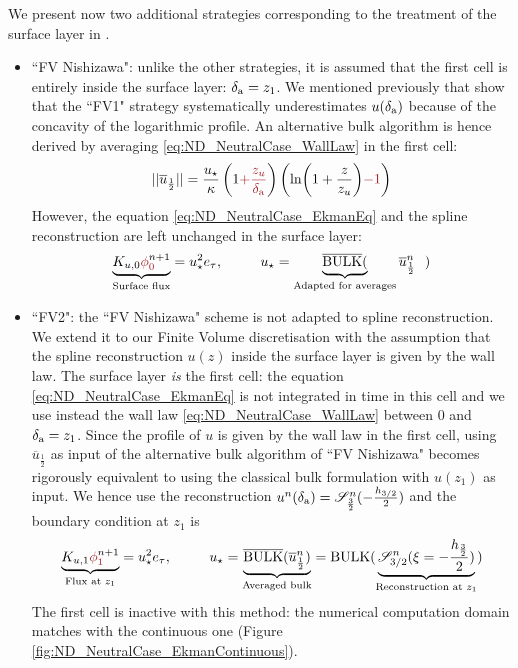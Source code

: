We present now two additional strategies corresponding to
the treatment of the surface layer in \citep{nishizawa_surface_2018}.
\begin{itemize}
    \item ``FV Nishizawa":  unlike the other strategies,
	    it is assumed that the first cell is entirely inside
		the surface layer: $\delta_{\rm a} = z_{1}$.
		We mentioned previously that
		\cite{nishizawa_surface_2018} show that the ``FV1"
		strategy systematically underestimates
		$u(\delta_{\rm a})$ because of the
	  concavity of the logarithmic profile.
	  An alternative bulk algorithm is hence derived by averaging
		\eqref{eq:ND_NeutralCase_WallLaw} in the first cell:
	\begin{equation}
		||\overline{u}_{\frac{1}{2}}||
		= \frac{u_\star}{\kappa}
		\left(1\emphase{+\frac{z_u}{\delta_{\rm a}}}\right)
		\left(\ln(1+\frac{z}{z_u})\emphase{-1}\right)
	\end{equation}
	However, the equation \eqref{eq:ND_NeutralCase_EkmanEq}
	and the spline reconstruction are left unchanged in the
	surface layer:
		  \begin{equation}
		\underbrace{K_{u,0} \emphase{\phi}^{n+1}_\emphase{0}}_{\text{Surface flux}}
		= u_\star^2 e_\tau, ~~~~~~~~
			  u_\star = \underbrace{\overline{{\rm BULK}}(}_{
				  \text{Adapted for averages}}
			  \overline{u}^{n}_{\frac{1}{2}}~~)
		  \end{equation}
	\item ``FV2": the ``FV Nishizawa" scheme is not adapted to
		spline reconstruction. We extend it to our
		Finite Volume discretisation with the assumption
		that the spline reconstruction $u(z)$ inside
		the surface layer is given by the wall law.
	    The surface layer \textit{is} the first cell:
	    the equation \eqref{eq:ND_NeutralCase_EkmanEq}
	    is not integrated in time in this cell
	and we use instead the wall law
	\eqref{eq:ND_NeutralCase_WallLaw} between 0 and
		$\delta_{\rm a} = z_1$.
	Since the profile of $u$ is given by the wall law
	in the first cell,
	using $\overline{u}_{\frac{1}{2}}$ as input of
	the alternative bulk algorithm of ``FV Nishizawa"
	becomes rigorously equivalent to using the
	classical bulk formulation with $u(z_1)$
	as input.
	We hence use the reconstruction
	$u^n(\delta_{\rm a}) = {\cal S}^n_{\frac{3}{2}}(
	  -\frac{h_{3/2}}{2})$ and the boundary condition
		  at $z_1$ is
	  \begin{equation}
		\underbrace{K_{u,1} \emphase{\phi}^{n+1}_\emphase{1}}_{\text{Flux at } z_1}
		= u_\star^2 e_\tau, ~~~~~~~~
			  u_\star = \underbrace{\overline{{\rm BULK}}(
			  \overline{u}^{n}_{\frac{1}{2}})}_{
				  \text{Averaged bulk}
			  } = {\rm BULK}(
			\underbrace{{\cal S}_{3/2}^{n}
			(\xi=-\frac{h_{\frac{3}{2}}}{2})}_{
				\text{Reconstruction at }
			z_{1}})
		  \end{equation}
	The first cell is inactive with this method:
	the numerical computation domain matches with the continuous
	one (Figure \ref{fig:ND_NeutralCase_EkmanContinuous}).
  \end{itemize}
